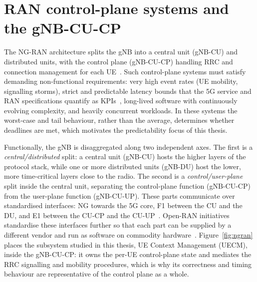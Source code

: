 \documentclass[english,twoside,openright,a4paper,censored,csm,software-track-2020]{HYthesisML}
\begin{document}
\section{RAN control-plane systems and the gNB-CU-CP}
The NG-RAN architecture splits the gNB into a central unit (gNB-CU) and distributed units,
with the control plane (gNB-CU-CP) handling RRC and connection management for each
UE~\cite{3gpp38401,3gpp38300,3gpp38331}. Such control-plane systems must satisfy demanding
non-functional requirements: very high event rates (UE mobility, signalling storms), strict
and predictable latency bounds that the 5G service and RAN specifications quantify as
KPIs~\cite{3gpp38913,3gpp22261}, long-lived software with continuously evolving complexity,
and heavily concurrent workloads. In these systems the worst-case and tail behaviour,
rather than the average, determines whether deadlines are met, which motivates the
predictability focus of this thesis.

Functionally, the gNB is disaggregated along two independent axes. The first is a
\emph{central/distributed} split: a central unit (gNB-CU) hosts the higher layers of the
protocol stack, while one or more distributed units (gNB-DU) host the lower, more
time-critical layers close to the radio. The second is a \emph{control/user-plane} split
inside the central unit, separating the control-plane function (gNB-CU-CP) from the
user-plane function (gNB-CU-UP). These parts communicate over standardised
interfaces: NG towards the 5G core, F1 between the CU and the DU, and E1 between the CU-CP and
the CU-UP~\cite{3gpp38401,3gpp38300,3gpp38463}. Open-RAN initiatives standardise these interfaces
further so that each part can be supplied by a different vendor and run as software on
commodity hardware~\cite{polese2023oran}. Figure~\ref{fig:ngran} places the subsystem studied
in this thesis, UE Context Management (UECM), inside the gNB-CU-CP: it owns the per-UE
control-plane state and mediates the RRC signalling and mobility procedures, which is why its
correctness and timing behaviour are representative of the control plane as a whole.
\end{document}
